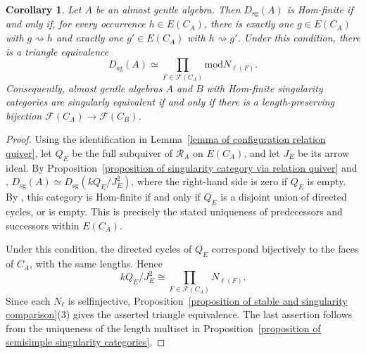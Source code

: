 \documentclass[11pt]{article}
\newcommand{\smod}{\operatorname{\underline{mod}}}
\newtheorem{corollary}[theorem]{Corollary}
\theoremstyle{definition}
\begin{document}
		\begin{corollary}\label{proposition of configuration singular criterion}
			Let $A$ be an almost gentle algebra. Then $D_{\mathrm{sg}}(A)$ is Hom-finite if and only if, for every occurrence $h\in E(C_A)$, there is exactly one $g\in E(C_A)$ with $g\rightsquigarrow h$ and exactly one $g'\in E(C_A)$ with $h\rightsquigarrow g'$. Under this condition, there is a triangle equivalence
			\[
				D_{\mathrm{sg}}(A)\simeq
				\prod_{F\in\mathcal F(C_A)}\smod N_{\ell(F)}.
			\]
			Consequently, almost gentle algebras $A$ and $B$ with Hom-finite singularity categories are singularly equivalent if and only if there is a length-preserving bijection $\mathcal F(C_A)\longrightarrow\mathcal F(C_B)$.
		\end{corollary}

		\begin{proof}
			Using the identification in Lemma~\ref{lemma of configuration relation quiver}, let $Q_E$ be the full subquiver of $\mathcal R_A$ on $E(C_A)$, and let $J_E$ be its arrow ideal. By Proposition~\ref{proposition of singularity category via relation quiver} and \cite[Lemma~4.3]{Che11}, $D_{\mathrm{sg}}(A)\simeq D_{\mathrm{sg}}(kQ_E/J_E^2)$, where the right-hand side is zero if $Q_E$ is empty.
			By \cite[Theorem~C]{Che11}, this category is Hom-finite if and only if $Q_E$ is a disjoint union of directed cycles, or is empty. This is precisely the stated uniqueness of predecessors and successors within $E(C_A)$.

			Under this condition, the directed cycles of $Q_E$ correspond bijectively to the faces of $C_A$, with the same lengths. Hence
			\[
				kQ_E/J_E^2\cong
				\prod_{F\in\mathcal F(C_A)}N_{\ell(F)}.
			\]
			Since each $N_\ell$ is selfinjective, Proposition~\ref{proposition of stable and singularity comparison}(3) gives the asserted triangle equivalence. The last assertion follows from the uniqueness of the length multiset in Proposition~\ref{proposition of semisimple singularity categories}.
		\end{proof}
\end{document}
